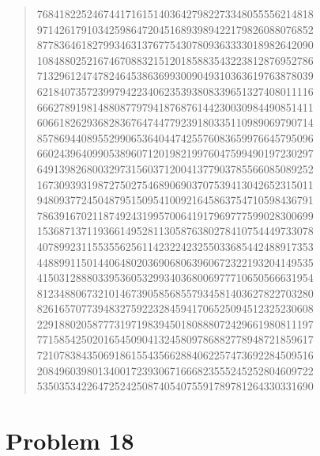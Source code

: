 \documentclass[oneside,12pt]{book}   	%
\theoremstyle{definition}
\begin{document}
\begin{spacing}{1.618}
\begin{quote}
76841822524674417161514036427982273348055556214818 \\
97142617910342598647204516893989422179826088076852 \\
87783646182799346313767754307809363333018982642090 \\
10848802521674670883215120185883543223812876952786 \\
71329612474782464538636993009049310363619763878039 \\
62184073572399794223406235393808339651327408011116 \\
66627891981488087797941876876144230030984490851411 \\
60661826293682836764744779239180335110989069790714 \\
85786944089552990653640447425576083659976645795096 \\
66024396409905389607120198219976047599490197230297 \\
64913982680032973156037120041377903785566085089252 \\
16730939319872750275468906903707539413042652315011 \\
94809377245048795150954100921645863754710598436791 \\
78639167021187492431995700641917969777599028300699 \\
15368713711936614952811305876380278410754449733078 \\
40789923115535562561142322423255033685442488917353 \\
44889911501440648020369068063960672322193204149535 \\
41503128880339536053299340368006977710650566631954 \\
81234880673210146739058568557934581403627822703280 \\
82616570773948327592232845941706525094512325230608 \\
22918802058777319719839450180888072429661980811197 \\
77158542502016545090413245809786882778948721859617 \\
72107838435069186155435662884062257473692284509516 \\
20849603980134001723930671666823555245252804609722 \\
53503534226472524250874054075591789781264330331690 
		\end{quote}
	\chapter{Problem 18}\label{A:P:18}
	

\end{spacing}
\end{document}
